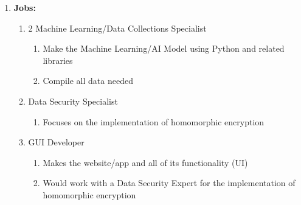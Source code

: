 \documentclass{article}
\begin{document}
\begin{enumerate}
\begin{enumerate}
\begin{enumerate}
\begin{enumerate}
                    \end{enumerate}
                \end{enumerate}
        \end{enumerate}
    \item \textbf{Jobs:}
    \begin{enumerate}
        \item 2 Machine Learning/Data Collections Specialist
        \begin{enumerate}
            \item Make the Machine Learning/AI Model using Python and related libraries
            \item Compile all data needed
        \end{enumerate}
        \item Data Security Specialist
        \begin{enumerate}
            \item Focuses on the implementation of homomorphic encryption
        \end{enumerate}
        \item GUI Developer
        \begin{enumerate}
            \item Makes the website/app and all of its functionality (UI)
            \item Would work with a Data Security Expert for the implementation of homomorphic encryption
        \end{enumerate}
    \end{enumerate}
\end{enumerate}
\end{document}
